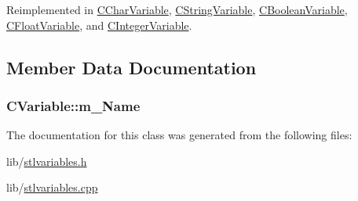 Reimplemented in \hyperlink{classCCharVariable_a534d79a4b878a3c6fe13d6681b27eed3}{C\-Char\-Variable}, \hyperlink{classCStringVariable_a905a362dccbeb5c062129219bdba5e0f}{C\-String\-Variable}, \hyperlink{classCBooleanVariable_aa7362a06640bf84322444e85094ad5ee}{C\-Boolean\-Variable}, \hyperlink{classCFloatVariable_a413448c60d1be13e1b28ea4e56733abc}{C\-Float\-Variable}, and \hyperlink{classCIntegerVariable_aa66b305e3ced11d63c64e7400f4d0434}{C\-Integer\-Variable}.



\subsection{Member Data Documentation}
\hypertarget{classCVariable_a0401971d7180f4e795bad294586fd542}{
\subsubsection[{m\-\_\-\-Name}]{ C\-Variable\-::m\-\_\-\-Name\hspace{0.3cm}{\ttfamily [protected]}}}\label{classCVariable_a0401971d7180f4e795bad294586fd542}


The documentation for this class was generated from the following files\-:\begin{DoxyCompactItemize}
\item 
lib/\hyperlink{stlvariables_8h}{stlvariables.\-h}\item 
lib/\hyperlink{stlvariables_8cpp}{stlvariables.\-cpp}\end{DoxyCompactItemize}
